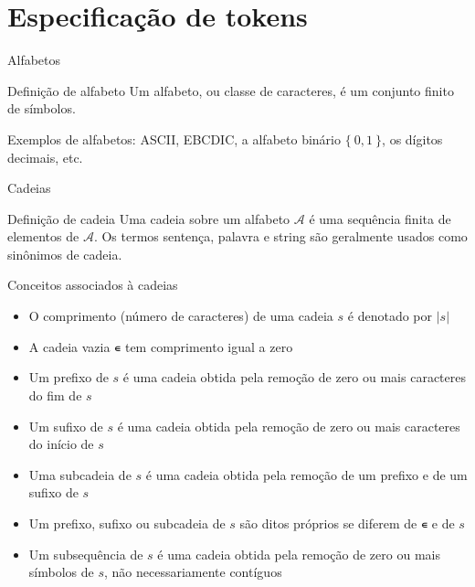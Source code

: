 \section{Especificação de tokens}

\begin{frame}[fragile]{Alfabetos}

    \begin{block}{Definição de alfabeto}
        Um alfabeto, ou classe de caracteres, é um conjunto finito de símbolos.
    \end{block}
    \pause

    \vspace{0.2in}

    Exemplos de alfabetos: ASCII, EBCDIC, a alfabeto binário $\{\ 0, 1\ \}$, os dígitos decimais, etc.

\end{frame}

\begin{frame}[fragile]{Cadeias}

    \begin{block}{Definição de cadeia}
        Uma cadeia sobre um alfabeto $\mathcal{A}$ é uma sequência finita de elementos de $\mathcal{A}$. Os termos sentença, palavra e string são geralmente
        usados como sinônimos de cadeia.
    \end{block}

\end{frame}

\begin{frame}[fragile]{Conceitos associados à cadeias}

    \begin{itemize}
        \item O comprimento (número de caracteres) de uma cadeia $s$ é denotado por $|s|$
        \pause

        \item A cadeia vazia \texttt{∊} tem comprimento igual a zero
        \pause

        \item Um prefixo de $s$ é uma cadeia obtida pela remoção de zero ou mais caracteres do fim de $s$
        \pause

        \item Um sufixo de $s$ é uma cadeia obtida pela remoção de zero ou mais caracteres do início de $s$
        \pause

        \item Uma subcadeia de $s$ é uma cadeia obtida pela remoção de um prefixo e de um sufixo de $s$
        \pause

        \item Um prefixo, sufixo ou subcadeia de $s$ são ditos próprios se diferem de \texttt{∊} e de $s$
        \pause

        \item Um subsequência de $s$ é uma cadeia obtida pela remoção de zero ou mais símbolos de $s$, não necessariamente contíguos
    \end{itemize}

\end{frame}

